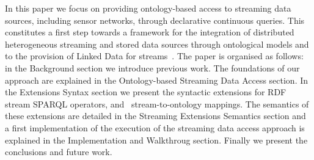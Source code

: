 In this paper we focus on providing ontology-based access to streaming data sources, including sensor networks, through
declarative continuous queries. This constitutes a first step towards a framework for the integration of distributed
heterogeneous streaming and stored data sources through ontological models and to the provision of Linked Data for
streams~\cite{LePhuoc_09,Page_09,Sequeda_09}. The paper is organised as follows: in the Background section %
we introduce previous work. The foundations of our approach are explained in the Ontology-based Streaming Data Access section. %
In the Extensions Syntax section
we present the syntactic extensions for RDF stream SPARQL operators, and \rtwoo\ stream-to-ontology
mappings. The semantics of these extensions are detailed in the Streaming Extensions Semantics section %
and a first implementation of the execution of the streaming data access approach is explained in the Implementation and Walkthroug section.%
Finally we present the conclusions and future work.
